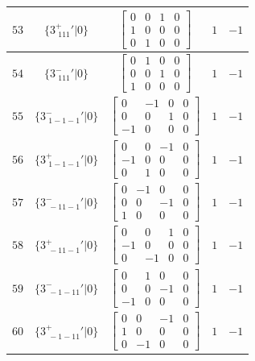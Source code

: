 \documentclass[fleqn,8pt]{jsarticle}
\begin{document}
\begin{longtable}{ccccc}
$ 53 $ & $ \{3^{+}_{\,\,111}{}'|0\} $ & $ \begin{bmatrix} 0 & 0 & 1 & 0 \\ 1 & 0 & 0 & 0 \\ 0 & 1 & 0 & 0 \end{bmatrix} $ & $ 1 $ & $ -1 $ \\ \hline
$ 54 $ & $ \{3^{-}_{\,\,111}{}'|0\} $ & $ \begin{bmatrix} 0 & 1 & 0 & 0 \\ 0 & 0 & 1 & 0 \\ 1 & 0 & 0 & 0 \end{bmatrix} $ & $ 1 $ & $ -1 $ \\ \hline
$ 55 $ & $ \{3^{-}_{\,\,1-1-1}{}'|0\} $ & $ \begin{bmatrix} 0 & -1 & 0 & 0 \\ 0 & 0 & 1 & 0 \\ -1 & 0 & 0 & 0 \end{bmatrix} $ & $ 1 $ & $ -1 $ \\ \hline
$ 56 $ & $ \{3^{+}_{\,\,1-1-1}{}'|0\} $ & $ \begin{bmatrix} 0 & 0 & -1 & 0 \\ -1 & 0 & 0 & 0 \\ 0 & 1 & 0 & 0 \end{bmatrix} $ & $ 1 $ & $ -1 $ \\ \hline
$ 57 $ & $ \{3^{-}_{\,\,-11-1}{}'|0\} $ & $ \begin{bmatrix} 0 & -1 & 0 & 0 \\ 0 & 0 & -1 & 0 \\ 1 & 0 & 0 & 0 \end{bmatrix} $ & $ 1 $ & $ -1 $ \\ \hline
$ 58 $ & $ \{3^{+}_{\,\,-11-1}{}'|0\} $ & $ \begin{bmatrix} 0 & 0 & 1 & 0 \\ -1 & 0 & 0 & 0 \\ 0 & -1 & 0 & 0 \end{bmatrix} $ & $ 1 $ & $ -1 $ \\ \hline
$ 59 $ & $ \{3^{-}_{\,\,-1-11}{}'|0\} $ & $ \begin{bmatrix} 0 & 1 & 0 & 0 \\ 0 & 0 & -1 & 0 \\ -1 & 0 & 0 & 0 \end{bmatrix} $ & $ 1 $ & $ -1 $ \\ \hline
$ 60 $ & $ \{3^{+}_{\,\,-1-11}{}'|0\} $ & $ \begin{bmatrix} 0 & 0 & -1 & 0 \\ 1 & 0 & 0 & 0 \\ 0 & -1 & 0 & 0 \end{bmatrix} $ & $ 1 $ & $ -1 $ \\ \hline

\end{longtable}
\end{document}

